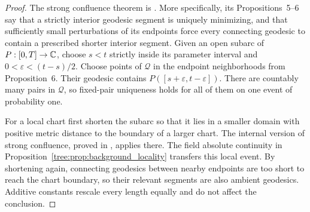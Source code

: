 \begin{proof}
The strong confluence theorem is
\cite[Theorem~2]{BhatiaKavvadiasConfluence}. More specifically, its
Propositions~5--6 say that a strictly interior geodesic segment
is uniquely minimizing, and that sufficiently small
perturbations of its endpoints force every connecting geodesic
to contain a prescribed shorter interior segment. Given an
open subarc of $P:[0,T]\to\mathbb C$, choose $s<t$ strictly inside its
parameter interval and $0<\varepsilon<(t-s)/2$. Choose points
of $\mathcal Q$ in the endpoint neighborhoods from
Proposition~6. Their geodesic contains
$P([s+\varepsilon,t-\varepsilon])$. There are countably many
pairs in $\mathcal Q$, so fixed-pair uniqueness holds for all
of them on one event of probability one.

For a local chart first shorten the subarc so that it lies
in a smaller domain with positive metric distance to the
boundary of a larger chart. The internal version of strong
confluence, proved in
\cite[Section~6.1, proof of Proposition~50,
Equation~(93)]{BhatiaKavvadiasConfluence}, applies there. The field
absolute continuity in Proposition~\ref{tree:prop:background_locality}
transfers this local event. By shortening again, connecting
geodesics between nearby endpoints are too short to reach
the chart boundary, so their relevant segments are also
ambient geodesics. Additive constants rescale every length
equally and do not affect the conclusion.
\end{proof}
